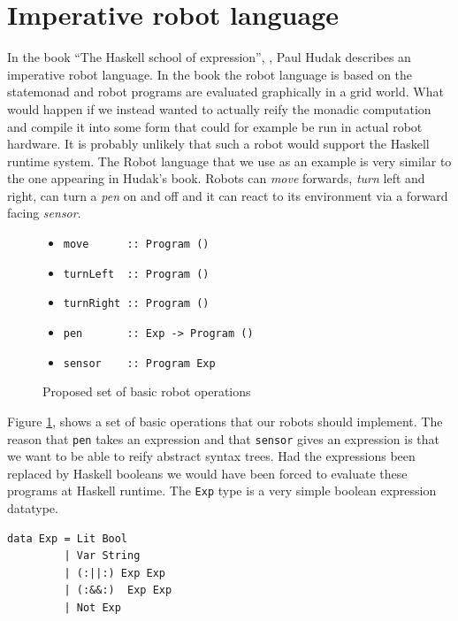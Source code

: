


\section{Imperative robot language}
In the book ``The Haskell school of expression'', \cite{HUDAK}, Paul Hudak 
describes an imperative robot language. In the book the robot language 
is based on the statemonad and robot programs are evaluated graphically 
in a grid world. What would happen if we instead wanted to actually reify 
the monadic computation and compile it into some form that could for example 
be run in actual robot hardware. It is probably unlikely that such a robot 
would support the Haskell runtime system.  
The Robot language that we use as an example is very similar to the one 
appearing in Hudak's book. Robots can {\em move} forwards, {\em turn} left 
and right, can turn a {\em pen} on and off and it can react to its 
environment via a forward facing {\em sensor}. 

\begin{figure} 
\begin{itemize} 
  \item \verb!move      :: Program ()! 
  \item \verb!turnLeft  :: Program ()!
  \item \verb!turnRight :: Program ()!
  \item \verb!pen       :: Exp -> Program ()!
  \item \verb!sensor    :: Program Exp!
\end{itemize} 
\label{fig:interface} 
\caption{Proposed set of basic robot operations} 
\end{figure}

Figure \ref{fig:interface}, shows a set of basic operations that our robots 
should implement. The reason that {\tt pen} takes an expression and that 
{\tt sensor} gives an expression is that we want to be able to reify abstract 
syntax trees. Had the expressions been replaced by Haskell booleans we would 
have been forced to evaluate these programs at Haskell runtime. The {\tt Exp} 
type is a very simple boolean expression datatype. 

\begin{small}
\begin{verbatim}
data Exp = Lit Bool
         | Var String
         | (:||:) Exp Exp
         | (:&&:)  Exp Exp
         | Not Exp  
\end{verbatim}
\end{small}
 
